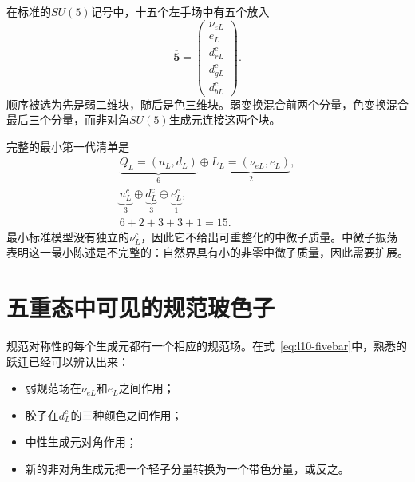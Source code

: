 在标准的\(SU(5)\)记号中，十五个左手场中有五个放入
\begin{equation}
\overline{\mathbf5}
=
\begin{pmatrix}
\nu_{eL}\\
e_L\\
d^c_{rL}\\
d^c_{gL}\\
d^c_{bL}
\end{pmatrix}.
\label{eq:l10-fivebar}
\end{equation}
顺序被选为先是弱二维块，随后是色三维块。弱变换混合前两个分量，色变换混合最后三个分量，而非对角\(SU(5)\)生成元连接这两个块。


完整的最小第一代清单是
\begin{equation}
\begin{gathered}
\underbrace{Q_L=(u_L,d_L)}_{6}
\oplus
\underbrace{L_L=(\nu_{eL},e_L)}_{2},\\
\underbrace{u^c_L}_{3}
\oplus
\underbrace{d^c_L}_{3}
\oplus
\underbrace{e^c_L}_{1},\\
6+2+3+3+1=15.
\end{gathered}
\label{eq:l10-fifteen}
\end{equation}
最小标准模型没有独立的\(\nu^c_L\)，因此它不给出可重整化的中微子质量。中微子振荡表明这一最小陈述是不完整的：自然界具有小的非零中微子质量，因此需要扩展。

\begin{classroomqa}
\end{classroomqa}

\section{五重态中可见的规范玻色子}

规范对称性的每个生成元都有一个相应的规范场。在式~\eqref{eq:l10-fivebar}中，熟悉的跃迁已经可以辨认出来：
\begin{itemize}
\item 弱规范场在\(\nu_{eL}\)和\(e_L\)之间作用；
\item 胶子在\(d^c_L\)的三种颜色之间作用；
\item 中性生成元对角作用；
\item 新的非对角生成元把一个轻子分量转换为一个带色分量，或反之。
\end{itemize}

